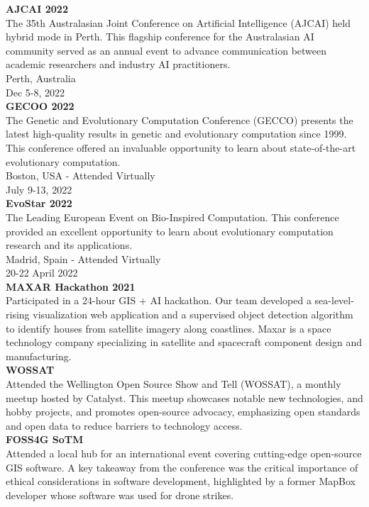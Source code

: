 \documentclass[9pt]{developercv}
\begin{document}
\textbf{AJCAI 2022} \\
The 35th Australasian Joint Conference on Artificial Intelligence (AJCAI) held hybrid mode in Perth. This flagship conference for the Australasian AI community served as an annual event to advance communication between academic researchers and industry AI practitioners. \\
Perth, Australia \\
Dec 5-8, 2022 \\

\textbf{GECOO 2022} \\
The Genetic and Evolutionary Computation Conference (GECCO) presents the latest high-quality results in genetic and evolutionary computation since 1999. This conference offered an invaluable opportunity to learn about state-of-the-art evolutionary computation. \\
Boston, USA - Attended Virtually \\
July 9-13, 2022 \\

\textbf{EvoStar 2022} \\
The Leading European Event on Bio-Inspired Computation. This conference provided an excellent opportunity to learn about evolutionary computation research and its applications. \\
Madrid, Spain - Attended Virtually \\
20-22 April 2022 \\

\textbf{MAXAR Hackathon 2021} \\
Participated in a 24-hour GIS + AI hackathon. Our team developed a sea-level-rising visualization web application and a supervised object detection algorithm to identify houses from satellite imagery along coastlines. Maxar is a space technology company specializing in satellite and spacecraft component design and manufacturing. \\

\textbf{WOSSAT} \\
Attended the Wellington Open Source Show and Tell (WOSSAT), a monthly meetup hosted by Catalyst. This meetup showcases notable new technologies, and hobby projects, and promotes open-source advocacy, emphasizing open standards and open data to reduce barriers to technology access. \\

\textbf{FOSS4G SoTM} \\
Attended a local hub for an international event covering cutting-edge open-source GIS software. A key takeaway from the conference was the critical importance of ethical considerations in software development, highlighted by a former MapBox developer whose software was used for drone strikes. \\
\end{document}
